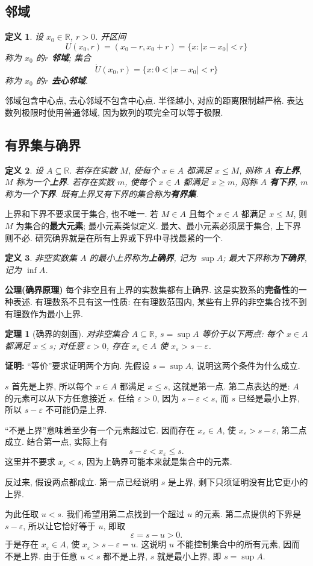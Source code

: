 \documentclass[UTF8,openany]{ctexbook}
\theoremstyle{chinesetextbook}
\newtheorem{definition}{定义}[section]
\newtheorem{theorem}{定理}[section]
\newenvironment{cnproof}{\par\indent\textbf{证明:} \ignorespaces}{\par}
\begin{document}
\subsection{邻域}
\begin{definition}
设 $x_0\in\mathbb R$, $r>0$. 开区间
\[
U(x_0,r)=(x_0-r,x_0+r)=\{x:|x-x_0|<r\}
\]
称为 $x_0$ 的\textbf{$r$ 邻域}; 集合
\[
\mathring U(x_0,r)=\{x:0<|x-x_0|<r\}
\]
称为 $x_0$ 的\textbf{$r$ 去心邻域}.
\end{definition}
邻域包含中心点, 去心邻域不包含中心点. 半径越小, 对应的距离限制越严格. 表达数列极限时使用普通邻域, 因为数列的项完全可以等于极限.
\subsection{有界集与确界}
\begin{definition}
设 $A\subseteq\mathbb R$. 若存在实数 $M$, 使每个 $x\in A$ 都满足 $x\le M$, 则称 $A$ \textbf{有上界}, $M$ 称为一个\textbf{上界}. 若存在实数 $m$, 使每个 $x\in A$ 都满足 $x\ge m$, 则称 $A$ \textbf{有下界}, $m$ 称为一个\textbf{下界}. 既有上界又有下界的集合称为\textbf{有界集}.
\end{definition}
上界和下界不要求属于集合, 也不唯一. 若 $M\in A$ 且每个 $x\in A$ 都满足 $x\le M$, 则 $M$ 为集合的\textbf{最大元素}; 最小元素类似定义. 最大、最小元素必须属于集合, 上下界则不必. 研究确界就是在所有上界或下界中寻找最紧的一个.
\begin{definition}
非空实数集 $A$ 的最小上界称为\textbf{上确界}, 记为 $\sup A$; 最大下界称为\textbf{下确界}, 记为 $\inf A$.
\end{definition}
\par\indent\textbf{公理(确界原理)} 每个非空且有上界的实数集都有上确界.
这是实数系的\textbf{完备性}的一种表述. 有理数系不具有这一性质: 在有理数范围内, 某些有上界的非空集合找不到有理数作为最小上界.
\begin{theorem}[确界的刻画]
对非空集合 $A\subseteq\mathbb R$, $s=\sup A$ 等价于以下两点: 每个 $x\in A$ 都满足 $x\le s$; 对任意 $\varepsilon>0$, 存在 $x_\varepsilon\in A$ 使 $x_\varepsilon>s-\varepsilon$.
\end{theorem}
\begin{cnproof}
“等价”要求证明两个方向. 先假设 $s=\sup A$, 说明这两个条件为什么成立.

$s$ 首先是上界, 所以每个 $x\in A$ 都满足 $x\le s$, 这就是第一点. 第二点表达的是: $A$ 的元素可以从下方任意接近 $s$. 任给 $\varepsilon>0$, 因为 $s-\varepsilon<s$, 而 $s$ 已经是最小上界, 所以 $s-\varepsilon$ 不可能仍是上界.

“不是上界”意味着至少有一个元素超过它. 因而存在 $x_\varepsilon\in A$, 使 $x_\varepsilon>s-\varepsilon$, 第二点成立. 结合第一点, 实际上有
\[
s-\varepsilon<x_\varepsilon\le s.
\]
这里并不要求 $x_\varepsilon<s$, 因为上确界可能本来就是集合中的元素.

反过来, 假设两点都成立. 第一点已经说明 $s$ 是上界, 剩下只须证明没有比它更小的上界.

为此任取 $u<s$. 我们希望用第二点找到一个超过 $u$ 的元素. 第二点提供的下界是 $s-\varepsilon$, 所以让它恰好等于 $u$, 即取
\[
\varepsilon=s-u>0.
\]
于是存在 $x_\varepsilon\in A$, 使 $x_\varepsilon>s-\varepsilon=u$. 这说明 $u$ 不能控制集合中的所有元素, 因而不是上界. 由于任意 $u<s$ 都不是上界, $s$ 就是最小上界, 即 $s=\sup A$.
\end{cnproof}
\end{document}

